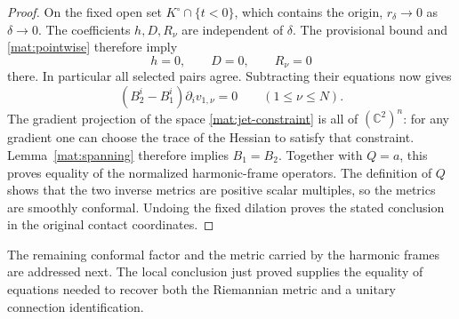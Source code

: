 \begin{proof}
On the fixed open set $K^\circ\cap\{t<0\}$, which contains the
origin, $r_\delta\to0$ as $\delta\to0$.  The coefficients $h,D,R_\nu$
are independent of $\delta$.  The provisional bound and
\eqref{mat:pointwise} therefore imply
\[
                   h=0,\qquad D=0,\qquad R_\nu=0
\]
there.  In particular all selected pairs agree.  Subtracting their
equations now gives
\[
                 (B_2^i-B_1^i)\partial_i v_{1,\nu}=0
                         \qquad(1\le\nu\le N).
\]
The gradient projection of the space
\eqref{mat:jet-constraint} is all of $(\mathbb C^2)^n$: for any
gradient one can choose the trace of the Hessian to satisfy that
constraint.  Lemma~\ref{mat:spanning} therefore implies $B_1=B_2$.
Together with $Q=a$, this proves equality of the normalized
harmonic-frame operators.  The definition of $Q$ shows that the two
inverse metrics are positive scalar multiples, so the metrics are
smoothly conformal.  Undoing the fixed dilation proves the stated
conclusion in the original contact coordinates.
\end{proof}

The remaining conformal factor and the metric carried by the harmonic
frames are addressed next.  The local conclusion just proved supplies
the equality of equations needed to recover both the Riemannian metric
and a unitary connection identification.
